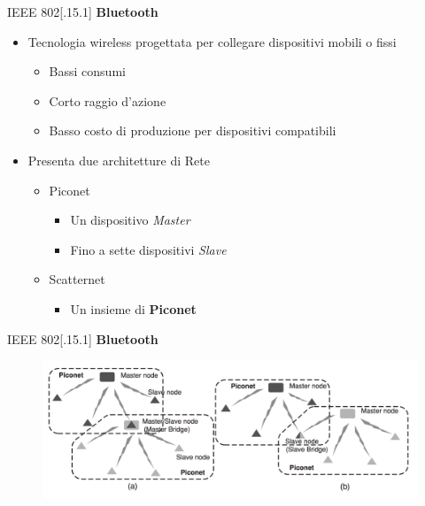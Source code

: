 \begin{frame}{IEEE 802[.15.1]}
	\textbf{Bluetooth}
	\begin{itemize}[<+- | alert@+>]
		\item Tecnologia wireless progettata per collegare dispositivi mobili o fissi
			\begin{itemize}[<+- | alert@+>]
				\item Bassi consumi
				\item Corto raggio d'azione
				\item Basso costo di produzione per dispositivi compatibili
			\end{itemize}
			\item Presenta due architetture di Rete
			\begin{itemize}[<+- | alert@+>]
				\item Piconet
				\begin{itemize}
					\item Un dispositivo \textit{Master}
					\item Fino a sette dispositivi \textit{Slave}
				\end{itemize}
				\item Scatternet
				\begin{itemize}[<+- | alert@+>]
					\item Un insieme di \textbf{Piconet}
				\end{itemize}
			\end{itemize}
	\end{itemize}		
\end{frame}

\begin{frame}{IEEE 802[.15.1]}
\textbf{Bluetooth}
	\begin{figure}[h] 
		\includegraphics[scale=0.3,cfbox=blue_slides 1pt 0pt]{imgs/bt.png}
	\end{figure}
\end{frame}

